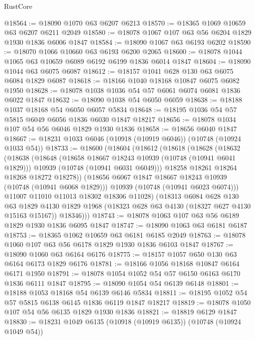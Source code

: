 \begin{lexlean}{RustCore}
\begin{coremodule}
@18564 := @18090 @1070 @63 @6207 @6213
@18570 := @18365 @1069 @10659 @63 @6207 @6211 @2049
@18580 := @18078 @1067 @107 @63 @56 @6204 @1829 @1930 @1836 @6006 @1847
@18584 := @18090 @1067 @63 @6193 @6202
@18590 := @18070 @1066 @10660 @63 @6193 @6200 @2065
@18600 := @18078 @1044 @1065 @63 @10659 @6089 @6192 @6199 @1836 @6014 @1847
@18604 := @18090 @1044 @63 @6075 @6087
@18612 := @18157 @1041 @628 @130 @63 @6075 @6084 @1829 @6087
@18618 := @18166 @1040 @18168 @10847 @6075 @6082 @1950
@18628 := @18078 @1038 @1036 @54 @57 @6061 @6074 @6081 @1836 @6022 @1847
@18632 := @18090 @1038 @54 @6050 @6059
@18638 := @18188 @1037 @18168 @54 @6050 @6057 @5834
@18648 := @18195 @1036 @54 @57 @5815 @6049 @6056 @1836 @6030 @1847 @18217
@18656 := @18078 @1034 @107 @54 @56 @6046 @1829 @1930 @1836
@18658 := @18656 @6040 @1847
@18667 := @18231 @1033 @6046 (@10918 (@10919 @6046)) (@10748 (@10924 @1033 @54))
@18733 := @18600
    (@18604
      (@18612
        (@18618
          (@18628
            (@18632
              (@18638
                (@18648
                  (@18658 @18667 @18243 @10939 (@10748 (@10941 @6041 @1829)))
                  @10939
                  (@10748 (@10941 @6031 @6049)))
                @18258
                @18261
                @18264
                @18268
                @18272
                @18278))
            (@18656 @6067 @1847 @18667 @18243 @10939 (@10748 (@10941 @6068 @1829)))
            @10939
            (@10748 (@10941 @6023 @6074)))
          @11007
          @11010
          @11013
          @18302
          @18306
          @11028)
        (@18313
          @6084
          @628
          @130
          @63
          @1829
          @4130
          @1829
          @1968
          (@18323 @628 @63 @4130 (@18327 @627 @4130 @15163 @15167))
          @18346)))
@18743 := @18078 @1063 @107 @63 @56 @6189 @1829 @1930 @1836 @6095 @1847
@18747 := @18090 @1063 @63 @6181 @6187
@18753 := @18365 @1062 @10659 @63 @6181 @6185 @2049
@18763 := @18078 @1060 @107 @63 @56 @6178 @1829 @1930 @1836 @6103 @1847
@18767 := @18090 @1060 @63 @6164 @6176
@18775 := @18157 @1057 @650 @130 @63 @6164 @6173 @1829 @6176
@18781 := @18166 @1056 @18168 @10847 @6164 @6171 @1950
@18791 := @18078 @1054 @1052 @54 @57 @6150 @6163 @6170 @1836 @6111 @1847
@18795 := @18090 @1054 @54 @6139 @6148
@18801 := @18188 @1053 @18168 @54 @6139 @6146 @5834
@18811 := @18195 @1052 @54 @57 @5815 @6138 @6145 @1836 @6119 @1847 @18217
@18819 := @18078 @1050 @107 @54 @56 @6135 @1829 @1930 @1836
@18821 := @18819 @6129 @1847
@18830 := @18231 @1049 @6135 (@10918 (@10919 @6135)) (@10748 (@10924 @1049 @54))

\end{coremodule}
\end{lexlean}
